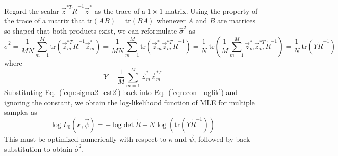 \documentclass[referee]{ieice}
\begin{document}
Regard the scalar $\vec{z}^{*T} \tilde{R}^{-1}\vec{z}^*$ as the trace of a $1\times 1$ matrix. Using the property of
the trace of a matrix that $\mathrm{tr}(AB)=\mathrm{tr}(BA)$ whenever $A$ and $B$ are matrices so shaped
that both products exist, we can reformulate $\hat{\sigma}^2$ as
\begin{equation} \label{eqn:sigma2_est2}
\hat{\sigma}^2 = \frac{1}{MN}\sum_{m=1}^{M}\mathrm{tr}(\vec{z}_m^{*T} \tilde{R}^{-1}\vec{z}_m^*)=\frac{1}{MN}\sum_{m=1}^{M}\mathrm{tr}(\vec{z}_m^*\vec{z}_m^{*T} \tilde{R}^{-1})=\frac{1}{N}~\mathrm{tr}\left(\frac{1}{M}\sum_{m=1}^{M}\vec{z}_m^*\vec{z}_m^{*T} \tilde{R}^{-1}\right)=\frac{1}{N}~\mathrm{tr}(Y\tilde{R}^{-1})
\end{equation}
where
\begin{equation}
Y=\frac{1}{M}\sum_{m=1}^{M}\vec{z}_m^*\vec{z}_m^{*T} %
\end{equation}
Substituting Eq.~(\ref{eqn:sigma2_est2}) back into Eq.~(\ref{eqn:con_loglik}) and ignoring the constant,
we obtain the log-likelihood function of MLE for multiple samples as
\begin{equation}
\log L_0(\kappa,\vec{\psi})=-\log \mathrm{det}~\tilde{R} - N\log (\mathrm{tr}(Y\tilde{R}^{-1}) )
\end{equation}
This must be optimized numerically with respect to $\kappa$ and $\vec{\psi}$,
followed by back substitution to obtain $\hat{\sigma}^2$.
\end{document}
